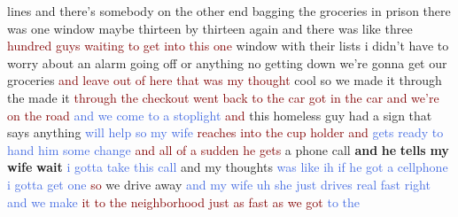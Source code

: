 lines and there's somebody on the other end bagging the groceries in prison there was one window maybe thirteen by thirteen again and there was like three \textcolor{Maroon}{hundred} \textcolor{Maroon}{guys} \textcolor{Maroon}{waiting} \textcolor{Maroon}{to} \textcolor{Maroon}{get} \textcolor{Maroon}{into} \textcolor{Maroon}{this} \textcolor{Maroon}{one} window with their lists i didn't have to worry about an alarm going off or anything no getting down we're gonna get our groceries \textcolor{Maroon}{and} \textcolor{Maroon}{leave} \textcolor{Maroon}{out} \textcolor{Maroon}{of} \textcolor{Maroon}{here} \textcolor{Maroon}{that} \textcolor{Maroon}{was} \textcolor{Maroon}{my} \textcolor{Maroon}{thought} cool so we made it through the made it \textcolor{Maroon}{through} \textcolor{Maroon}{the} \textcolor{Maroon}{checkout} \textcolor{Maroon}{went} \textcolor{Maroon}{back} \textcolor{Maroon}{to} \textcolor{Maroon}{the} \textcolor{Maroon}{car} \textcolor{Maroon}{got} \textcolor{Maroon}{in} \textcolor{Maroon}{the} \textcolor{Maroon}{car} \textcolor{Maroon}{and} \textcolor{Maroon}{we're} \textcolor{Maroon}{on} \textcolor{Maroon}{the} \textcolor{Maroon}{road} \textcolor{RoyalBlue}{and} \textcolor{RoyalBlue}{we} \textcolor{RoyalBlue}{come} \textcolor{RoyalBlue}{to} \textcolor{RoyalBlue}{a} \textcolor{RoyalBlue}{stoplight} \textcolor{Maroon}{and} this homeless guy had a sign that says anything \textcolor{RoyalBlue}{will} \textcolor{RoyalBlue}{help} \textcolor{RoyalBlue}{so} \textcolor{RoyalBlue}{my} \textcolor{RoyalBlue}{wife} \textcolor{Maroon}{reaches} \textcolor{Maroon}{into} \textcolor{Maroon}{the} \textcolor{Maroon}{cup} \textcolor{Maroon}{holder} \textcolor{Maroon}{and} \textcolor{RoyalBlue}{gets} \textcolor{RoyalBlue}{ready} \textcolor{RoyalBlue}{to} \textcolor{RoyalBlue}{hand} \textcolor{RoyalBlue}{him} \textcolor{RoyalBlue}{some} \textcolor{RoyalBlue}{change} \textcolor{Maroon}{and} \textcolor{Maroon}{all} \textcolor{Maroon}{of} \textcolor{Maroon}{a} \textcolor{Maroon}{sudden} \textcolor{Maroon}{he} \textcolor{Maroon}{gets} a phone call \textbf{and} \textbf{he} \textbf{tells} \textbf{my} \textbf{wife} \textbf{wait} \textcolor{RoyalBlue}{i} \textcolor{RoyalBlue}{gotta} \textcolor{RoyalBlue}{take} \textcolor{RoyalBlue}{this} \textcolor{RoyalBlue}{call} and my thoughts \textcolor{RoyalBlue}{was} \textcolor{RoyalBlue}{like} \textcolor{RoyalBlue}{ih} \textcolor{RoyalBlue}{if} \textcolor{RoyalBlue}{he} \textcolor{RoyalBlue}{got} \textcolor{RoyalBlue}{a} \textcolor{RoyalBlue}{cellphone} \textcolor{RoyalBlue}{i} \textcolor{RoyalBlue}{gotta} \textcolor{RoyalBlue}{get} \textcolor{RoyalBlue}{one} \textcolor{Maroon}{so} we drive away \textcolor{RoyalBlue}{and} \textcolor{RoyalBlue}{my} \textcolor{RoyalBlue}{wife} \textcolor{RoyalBlue}{uh} \textcolor{RoyalBlue}{she} \textcolor{RoyalBlue}{just} \textcolor{RoyalBlue}{drives} \textcolor{RoyalBlue}{real} \textcolor{RoyalBlue}{fast} \textcolor{RoyalBlue}{right} \textcolor{RoyalBlue}{and} \textcolor{RoyalBlue}{we} \textcolor{RoyalBlue}{make} \textcolor{Maroon}{it} \textcolor{Maroon}{to} \textcolor{Maroon}{the} \textcolor{Maroon}{neighborhood} \textcolor{Maroon}{just} \textcolor{Maroon}{as} \textcolor{Maroon}{fast} \textcolor{Maroon}{as} \textcolor{Maroon}{we} \textcolor{Maroon}{got} \textcolor{RoyalBlue}{to} \textcolor{RoyalBlue}{the} 